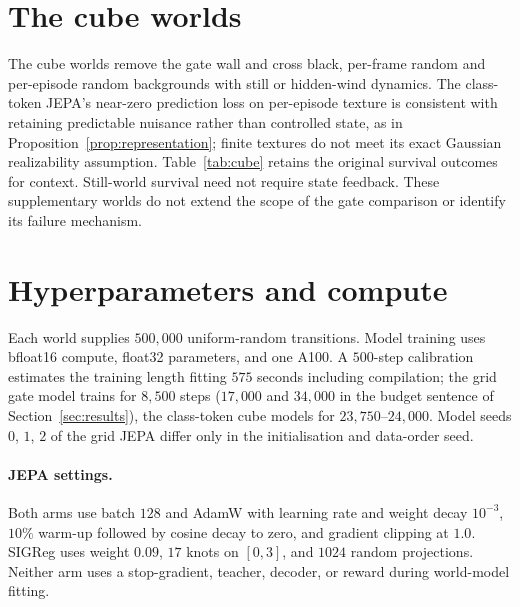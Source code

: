 \section{The cube worlds}
\label{app:cubes}

The cube worlds remove the gate wall and cross black, per-frame random and per-episode random
backgrounds with still or hidden-wind dynamics. The class-token JEPA's near-zero prediction loss
on per-episode texture is consistent with retaining predictable nuisance rather than controlled
state, as in Proposition~\ref{prop:representation}; finite textures do not meet its exact Gaussian
realizability assumption. Table~\ref{tab:cube} retains the original survival outcomes for context.
Still-world survival need not require state feedback. These supplementary worlds do not extend the
scope of the gate comparison or identify its failure mechanism.

\begin{table}[ht]
\centering
\caption{Survival (percent) in the supplementary cube worlds. ``LeWM'' denotes the class-token JEPA;
``grid'' denotes the grid JEPA; ``goal'' and ``heads'' use latent-goal and learned-return search,
respectively. PPO columns use the final saved policies; ``px'' and ``z'' identify pixel and latent
observations. Still-world survival does not certify state feedback.}
\label{tab:cube}
\end{table}

\section{Hyperparameters and compute}
\label{app:hparams}

Each world supplies $500{,}000$ uniform-random transitions. Model training uses bfloat16 compute,
float32 parameters, and one A100. A $500$-step calibration estimates the training length fitting
$575$ seconds including compilation; the grid gate model trains for $8{,}500$ steps ($17{,}000$ and $34{,}000$ in the budget sentence of Section~\ref{sec:results}), the class-token cube models for $23{,}750$--$24{,}000$.
Model seeds $0$, $1$, $2$ of the grid JEPA differ only in the initialisation and data-order seed.

\paragraph{JEPA settings.}
Both arms use batch $128$ and AdamW with learning rate and weight decay $10^{-3}$, $10\%$ warm-up
followed by cosine decay to zero, and gradient clipping at $1.0$. SIGReg uses weight $0.09$, $17$
knots on $[0,3]$, and $1024$ random projections. Neither arm uses a stop-gradient, teacher, decoder, or
reward during world-model fitting.

